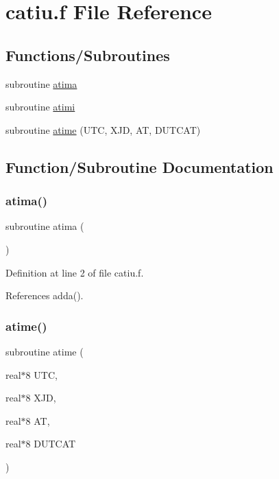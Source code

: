 \hypertarget{catiu_8f}{}\section{catiu.\+f File Reference}
\label{catiu_8f}
\subsection*{Functions/\+Subroutines}
\begin{DoxyCompactItemize}
\item 
subroutine \hyperlink{catiu_8f_af5d55e2794676aa6c3b5c737b8e7aa37}{atima}
\item 
subroutine \hyperlink{catiu_8f_a4742b718b4bb42b9e9d433433bb5b247}{atimi}
\item 
subroutine \hyperlink{catiu_8f_a1b194ff21fc4bc731c6c9581f19a8026}{atime} (U\+TC, X\+JD, AT, D\+U\+T\+C\+AT)
\end{DoxyCompactItemize}


\subsection{Function/\+Subroutine Documentation}
\mbox{\label{catiu_8f_af5d55e2794676aa6c3b5c737b8e7aa37}} 
\subsubsection{\texorpdfstring{atima()}{atima()}}
{\footnotesize\ttfamily subroutine atima (\begin{DoxyParamCaption}{ }\end{DoxyParamCaption})}



Definition at line 2 of file catiu.\+f.



References adda().

\mbox{\label{catiu_8f_a1b194ff21fc4bc731c6c9581f19a8026}} 
\subsubsection{\texorpdfstring{atime()}{atime()}}
{\footnotesize\ttfamily subroutine atime (\begin{DoxyParamCaption}\item[{real$\ast$8}]{U\+TC,  }\item[{real$\ast$8}]{X\+JD,  }\item[{real$\ast$8}]{AT,  }\item[{real$\ast$8}]{D\+U\+T\+C\+AT }\end{DoxyParamCaption})}



